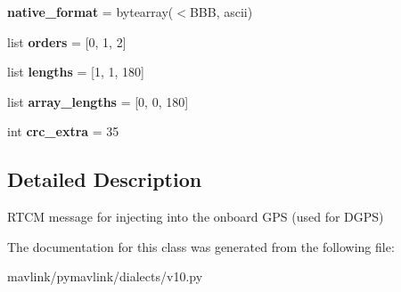 \begin{DoxyCompactItemize}
{\bfseries native\+\_\+format} = bytearray(\textquotesingle{}$<$B\+BB\textquotesingle{}, \textquotesingle{}ascii\textquotesingle{})
\item 
\mbox{\label{classpymavlink_1_1dialects_1_1v10_1_1MAVLink__gps__rtcm__data__message_afd067de03eac44017afa1e1abeb46df8}} 
list {\bfseries orders} = \mbox{[}0, 1, 2\mbox{]}
\item 
\mbox{\label{classpymavlink_1_1dialects_1_1v10_1_1MAVLink__gps__rtcm__data__message_ac060ed0bac7c167b01de72d2b0aaab25}} 
list {\bfseries lengths} = \mbox{[}1, 1, 180\mbox{]}
\item 
\mbox{\label{classpymavlink_1_1dialects_1_1v10_1_1MAVLink__gps__rtcm__data__message_a05b5569c5c1b60390b6b4d0c921712ee}} 
list {\bfseries array\+\_\+lengths} = \mbox{[}0, 0, 180\mbox{]}
\item 
\mbox{\label{classpymavlink_1_1dialects_1_1v10_1_1MAVLink__gps__rtcm__data__message_ae2a802480273c5629c57556b80066e2e}} 
int {\bfseries crc\+\_\+extra} = 35
\end{DoxyCompactItemize}


\subsection{Detailed Description}
\begin{DoxyVerb}RTCM message for injecting into the onboard GPS (used for
DGPS)
\end{DoxyVerb}
 

The documentation for this class was generated from the following file\+:\begin{DoxyCompactItemize}
\item 
mavlink/pymavlink/dialects/v10.\+py\end{DoxyCompactItemize}
